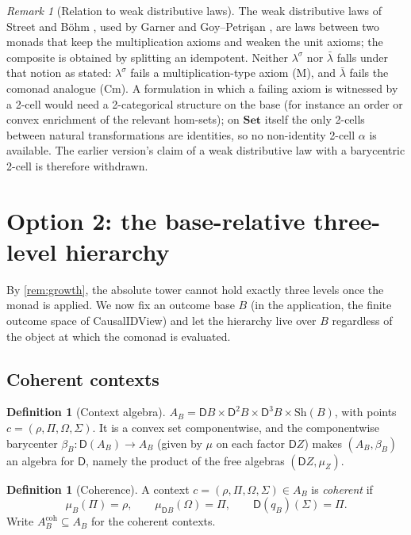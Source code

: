\documentclass[11pt]{article}
\theoremstyle{definition}
\newtheorem{definition}[theorem]{Definition}
\theoremstyle{remark}
\newtheorem{remark}[theorem]{Remark}
\newcommand{\D}{\mathsf{D}}
\newcommand{\Set}{\mathbf{Set}}
\newcommand{\Sh}{\mathrm{Sh}}
\newcommand{\lb}{\bar\lambda}
\newcommand{\ls}{\lambda^{\sigma}}
\begin{document}
\begin{remark}[Relation to weak distributive laws]\label{rem:weak}
The weak distributive laws of Street and B\"ohm \cite{Street2009,Bohm2010,BohmLackStreet2011}, used by
Garner \cite{Garner2020} and Goy--Petri\c{s}an \cite{GoyPetrisan2020}, are laws between two monads
that keep the multiplication axioms and weaken the unit axioms; the composite is obtained by
splitting an idempotent. Neither $\ls$ nor $\lb$ falls under that notion as stated: $\ls$ fails a
multiplication-type axiom (M), and $\lb$ fails the comonad analogue (Cm). A formulation in which a
failing axiom is witnessed by a 2-cell would need a 2-categorical structure on the base (for instance
an order or convex enrichment of the relevant hom-sets); on $\Set$ itself the only 2-cells between
natural transformations are identities, so no non-identity 2-cell $\alpha$ is available. The earlier
version's claim of a weak distributive law with a barycentric 2-cell is therefore withdrawn.
\end{remark}

\section{Option 2: the base-relative three-level hierarchy}\label{sec:relative}

By \cref{rem:growth}, the absolute tower cannot hold exactly three levels once the monad is applied.
We now fix an outcome base $B$ (in the application, the finite outcome space of CausalIDView) and let
the hierarchy live over $B$ regardless of the object at which the comonad is evaluated.

\subsection{Coherent contexts}

\begin{definition}[Context algebra]
$A_B=\D B\times\D^2B\times\D^3B\times\Sh(B)$, with points $c=(\rho,\Pi,\Omega,\Sigma)$. It is a convex
set componentwise, and the componentwise barycenter $\beta_B\colon\D(A_B)\to A_B$ (given by $\mu$ on
each factor $\D Z$) makes $(A_B,\beta_B)$ an algebra for $\D$, namely the product of the free algebras
$(\D Z,\mu_Z)$.
\end{definition}

\begin{definition}[Coherence]
A context $c=(\rho,\Pi,\Omega,\Sigma)\in A_B$ is \emph{coherent} if
\[
\mu_B(\Pi)=\rho,\qquad \mu_{\D B}(\Omega)=\Pi,\qquad \D(q_B)(\Sigma)=\Pi .
\]
Write $A_B^{\mathrm{coh}}\subseteq A_B$ for the coherent contexts.
\end{definition}
\end{document}
